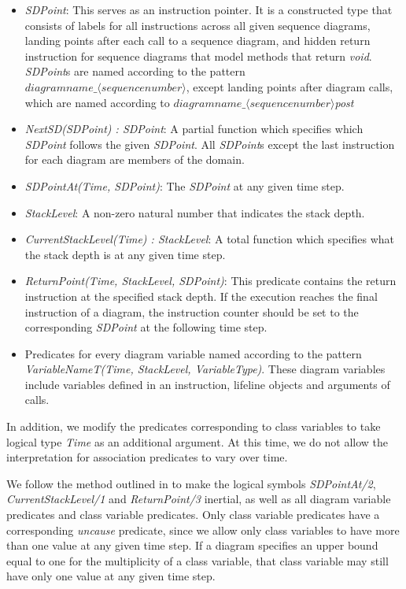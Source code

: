 \documentclass[conference]{IEEEtran}
\begin{document}
\begin{itemize}
	\item \textit{SDPoint}: This serves as an instruction pointer. It is a constructed type that consists of labels for all instructions across all given sequence diagrams, landing points after each call to a sequence diagram, and hidden return instruction for sequence diagrams that model methods that return \textit{void}. \textit{SDPoint}s are named according to the pattern \textit{$diagramname\_\langle{}sequencenumber\rangle$}, except landing points after diagram calls, which are named according to \textit{$diagramname\_\langle{}sequencenumber\rangle$post}
	\item \textit{NextSD(SDPoint) : SDPoint}: A partial function which specifies which \textit{SDPoint} follows the given \textit{SDPoint}. All \textit{SDPoint}s except the last instruction for each diagram are members of the domain.
	\item \textit{SDPointAt(Time, SDPoint)}: The \textit{SDPoint} at any given time step.
	\item \textit{StackLevel}: A non-zero natural number that indicates the stack depth.
	\item \textit{CurrentStackLevel(Time) : StackLevel}: A total function which specifies what the stack depth is at any given time step.
	\item \textit{ReturnPoint(Time, StackLevel, SDPoint)}: This predicate contains the return instruction at the specified stack depth. If the execution reaches the final instruction of a diagram, the instruction counter should be set to the corresponding \textit{SDPoint} at the following time step.
	\item Predicates for every diagram variable named according to the pattern \textit{VariableNameT(Time, StackLevel, VariableType)}. These diagram variables include variables defined in an instruction, lifeline objects and arguments of calls.
\end{itemize}

In addition, we modify the predicates corresponding to class variables to take logical type \textit{Time} as an additional argument. At this time, we do not allow the interpretation for association predicates to vary over time.

We follow the method outlined in \cite{BogaertsBart2014Sdsu} to make the logical symbols \textit{SDPointAt/2}, \textit{CurrentStackLevel/1} and \textit{ReturnPoint/3} inertial, as well as all diagram variable predicates and class variable predicates. Only class variable predicates have a corresponding \textit{uncause} predicate, since we allow only class variables to have more than one value at any given time step. If a diagram specifies an upper bound equal to one for the multiplicity of a class variable, that class variable may still have only one value at any given time step.
\end{document}
